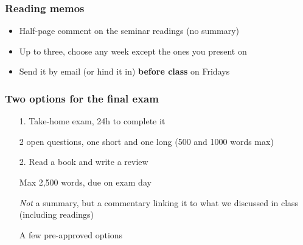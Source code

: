 \documentclass[aspectratio=43]{beamer}
\begin{document}
\begin{frame}
\frametitle{Reading memos}
\centering

\begin{itemize}
  \item Half-page comment on the seminar readings (no summary)
  \item Up to three, choose any week except the ones you present on
  \item Send it by email (or hind it in) \textbf{before class} on Fridays
\end{itemize}

\end{frame}

\begin{frame}
\frametitle{Two options for the final exam}
\centering

\begin{itemize}
\item[1.] Take-home exam, 24h to complete it
\item[] 2 open questions, one short and one long (500 and 1000 words max)
\item[]
\item[2.] Read a book and write a review
\item[] Max 2,500 words, due on exam day
\item[] \textit{Not} a summary, but a commentary linking it to what we discussed in class (including readings)
\item[] A few pre-approved options
\end{itemize}

\end{frame}
\end{document}
